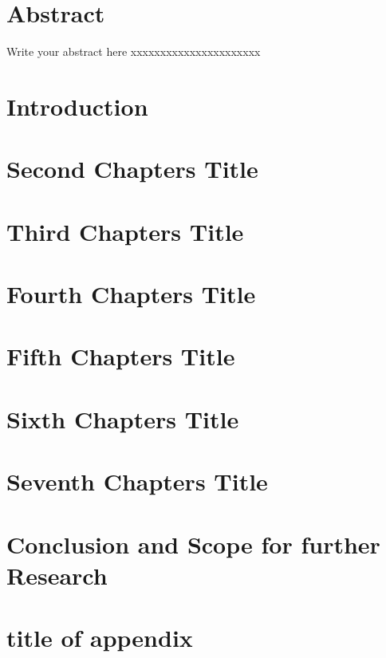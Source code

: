 \documentclass[a4paper, 12pt]{report}
\theoremstyle{definition}
\begin{document}
\chapter*{Abstract}
Write your abstract here xxxxxxxxxxxxxxxxxxxxxx \\

\clearpage
{}
\setcounter{page}{1}
\chapter{Introduction}

\chapter{Second Chapters Title}

\chapter{Third Chapters Title}

\chapter{Fourth Chapters Title}
 
\chapter{Fifth Chapters Title}

\chapter{Sixth Chapters Title}

\chapter{Seventh Chapters Title}

\chapter{Conclusion and Scope for further Research}

\appendix
\chapter{title of appendix}


\newpage
\renewcommand{\bibname}{References}


\end{document}
